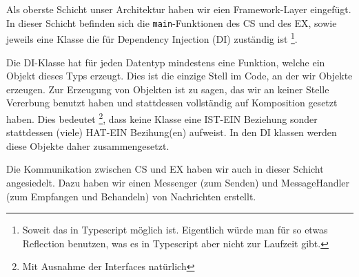   Als oberste Schicht unser Architektur haben wir eien Framework-Layer eingefügt. In dieser Schicht befinden sich die \texttt{main}-Funktionen des CS und des EX, sowie jeweils eine Klasse die für Dependency Injection (DI) zuständig ist \footnote{Soweit das in Typescript möglich ist. Eigentlich würde man für so etwas Reflection benutzen, was es in Typescript aber nicht zur Laufzeit gibt.}.
  
  Die DI-Klasse hat für jeden Datentyp mindestens eine Funktion, welche ein Objekt dieses Typs erzeugt. Dies ist die einzige Stell im Code, an der wir Objekte erzeugen. Zur Erzeugung von Objekten ist zu sagen, das wir an keiner Stelle Vererbung benutzt haben und stattdessen vollständig auf Komposition gesetzt haben. Dies bedeutet \footnote{Mit Ausnahme der Interfaces natürlich}, dass keine Klasse eine IST-EIN Beziehung sonder stattdessen (viele) HAT-EIN Bezihung(en) aufweist. In den DI klassen werden diese Objekte daher zusammengesetzt.

  Die Kommunikation zwischen CS und EX haben wir auch in dieser Schicht angesiedelt. Dazu haben wir einen Messenger (zum Senden) und MessageHandler (zum Empfangen und Behandeln) von Nachrichten erstellt.
